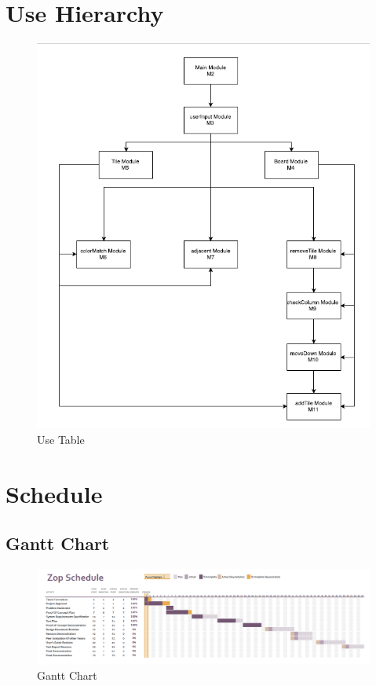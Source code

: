 \documentclass[12pt]{article}
\begin{document}
\section{Use Hierarchy}
\begin{figure}[h!]
\includegraphics[width=17cm]{useTable}
\caption{Use Table}
\end{figure}
\newpage
\section{Schedule}
\subsection{Gantt Chart}

\begin{figure}[h!]
\includegraphics[width=17cm]{gantt}
\caption{Gantt Chart}
\end{figure}
\end{document}
